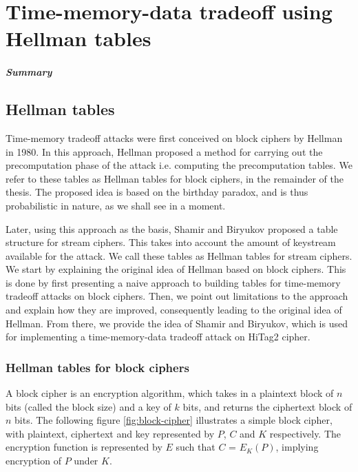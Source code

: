 \chapter{Time-memory-data tradeoff using Hellman tables}
\label{chapter:tmdto-hellman}

\paragraph{Summary}


\section{Hellman tables}
Time-memory tradeoff attacks were first conceived on block ciphers by Hellman in 1980. In this approach, Hellman proposed a method for carrying out the precomputation phase of the attack i.e. computing the precomputation tables. We refer to these tables as Hellman tables for block ciphers, in the remainder of the thesis. The proposed idea is based on the birthday paradox, and is thus probabilistic in nature, as we shall see in a moment. 

Later, using this approach as the basis, Shamir and Biryukov proposed a table structure for stream ciphers. This takes into account the amount of keystream available for the attack. We call these tables as Hellman tables for stream ciphers. We start by explaining the original idea of Hellman based on block ciphers. This is done by first presenting a naive approach to building tables for time-memory tradeoff attacks on block ciphers. Then, we point out limitations to the approach and explain how they are improved, consequently leading to the original idea of Hellman. From there, we provide the idea of Shamir and Biryukov, which is used for implementing a time-memory-data tradeoff attack on HiTag2 cipher. 

\subsection{Hellman tables for block ciphers}

A block cipher is an encryption algorithm, which takes in a plaintext block of $n$ bits (called the block size) and a key of $k$ bits, and returns the ciphertext block of $n$ bits. The following figure \ref{fig:block-cipher} illustrates a simple block cipher, with plaintext, ciphertext and key represented by $P$, $C$ and $K$ respectively. The encryption function is represented by $E$ such that $C$ = $E_K(P)$, implying encryption of $P$ under $K$.

